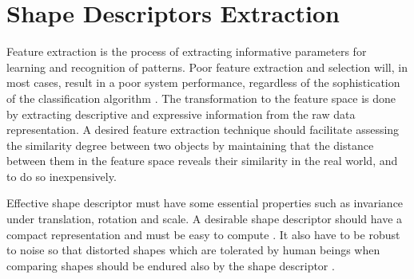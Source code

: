 \newpage{}

\section{Shape Descriptors Extraction}
\label{sec:feature_extraction}
\iftoggle{edit-mode}{\hspace{0pt}\marginpar{Feature extraction}}{}
Feature extraction is the process of extracting informative parameters for learning and recognition of patterns. 
Poor feature extraction and selection will, in most cases, result in a poor system performance, regardless of the sophistication of the classification algorithm \cite{parizeau2001character}.
The transformation to the feature space is done by extracting descriptive and expressive information from the raw data representation. 
A desired feature extraction technique should facilitate assessing the similarity degree between two objects by maintaining that the distance between them in the feature space reveals their similarity in the real world, and to do so inexpensively.


\iftoggle{edit-mode}{\hspace{0pt}\marginpar{Shape Descriptors}}{}
Effective shape descriptor must have some essential properties such as invariance under translation, rotation and scale. 
A desirable shape descriptor should have a compact representation and must be easy to compute \cite{zhang2004review}.
It also have to be robust to noise so that distorted shapes which are tolerated by human beings when comparing shapes should be endured also by the shape descriptor \cite{zhang2004review, kim2000region}.

